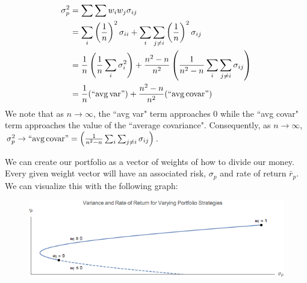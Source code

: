 \documentclass[11pt]{article}
\theoremstyle{definition}
\begin{document}
\begin{align*}
\sigma_p^2 	&= \sum \sum w_i w_j \sigma_{i j}\\
			&= \sum_i \left(\frac 1n\right)^2 \sigma_{i i} + \sum_i \sum_{j \neq i} \left(\frac 1n\right)^2 \sigma_{ij}\\
			&= \frac 1n \left(\frac 1n \sum_i \sigma_i^2\right) + \frac{n^2 - n}{n^2}\left(\frac{1}{n^2 - n} \sum_i \sum_{j\neq i}\sigma_{ij}\right)\\
			&= \frac 1n (\mathrm{``avg \, var"}) + \frac{n^2 - n}{n^2}(\mathrm{``avg \, covar"}) 
\end{align*}
We note that as $n \to \infty$, the ``avg var" term  approaches 0 while the ``avg covar" term approaches the value of the ``average covariance". Consequently, as $n \to \infty$, $\sigma_p^2 \to \mathrm{``avg \, covar"} = \left(\frac{1}{n^2 - n} \sum_i \sum_{j\neq i}\sigma_{ij}\right)$.

We can create our portfolio as a vector of weights of how to divide our money. Every given weight vector will have an associated risk, $\sigma_p$ and rate of return $\bar{r}_p$. We can visualize this with the following graph:
\begin{figure}
\centering
\includegraphics[scale=.5]{figures/stocks.png}
\end{figure}
\newpage
\end{document}
